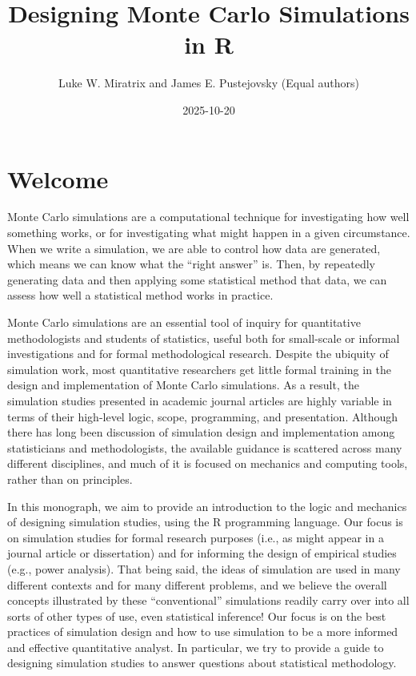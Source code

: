 \documentclass[
]{book}
\title{Designing Monte Carlo Simulations in R}
\author{Luke W. Miratrix and James E. Pustejovsky
(Equal authors)}
\date{2025-10-20}
\begin{document}
\maketitle

{
\setcounter{tocdepth}{1}
\tableofcontents
}
\chapter*{Welcome}\label{welcome}

Monte Carlo simulations are a computational technique for investigating how well something works, or for investigating what might happen in a given circumstance.
When we write a simulation, we are able to control how data are generated, which means we can know what the ``right answer'' is.
Then, by repeatedly generating data and then applying some statistical method that data, we can assess how well a statistical method works in practice.

Monte Carlo simulations are an essential tool of inquiry for quantitative methodologists and students of statistics, useful both for small-scale or informal investigations and for formal methodological research.
Despite the ubiquity of simulation work, most quantitative researchers get little formal training in the design and implementation of Monte Carlo simulations. As a result, the simulation studies presented in academic journal articles are highly variable in terms of their high-level logic, scope, programming, and presentation.
Although there has long been discussion of simulation design and implementation among statisticians and methodologists, the available guidance is scattered across many different disciplines, and much of it is focused on mechanics and computing tools, rather than on principles.

In this monograph, we aim to provide an introduction to the logic and mechanics of designing simulation studies, using the R programming language.
Our focus is on simulation studies for formal research purposes (i.e., as might appear in a journal article or dissertation) and for informing the design of empirical studies (e.g., power analysis).
That being said, the ideas of simulation are used in many different contexts and for many different problems, and we believe the overall concepts illustrated by these ``conventional'' simulations readily carry over into all sorts of other types of use, even statistical inference!
Our focus is on the best practices of simulation design and how to use simulation to be a more informed and effective quantitative analyst.
In particular, we try to provide a guide to designing simulation studies to answer questions about statistical methodology.
\end{document}
